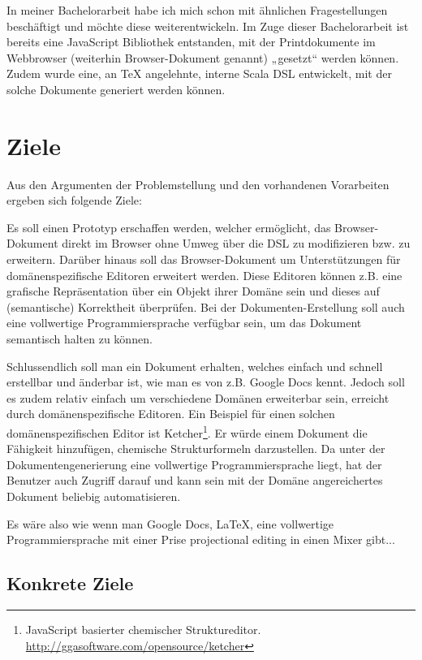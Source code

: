 In meiner Bachelorarbeit habe ich mich schon mit ähnlichen Fragestellungen
beschäftigt und möchte diese weiterentwickeln.
Im Zuge dieser Bachelorarbeit ist bereits eine JavaScript Bibliothek
entstanden, mit der Printdokumente im Webbrowser
(weiterhin Browser-Dokument genannt) „gesetzt“ werden können.
Zudem wurde eine, an TeX angelehnte, interne Scala DSL entwickelt,
mit der solche Dokumente generiert werden können.


\section{Ziele}

Aus den Argumenten der Problemstellung und den vorhandenen Vorarbeiten
ergeben sich folgende Ziele:

Es soll einen Prototyp erschaffen werden, welcher ermöglicht,
das Browser-Doku\-ment direkt im Browser ohne Umweg über die DSL
zu modifizieren bzw. zu erweitern.
Darüber hinaus soll das Browser-Dokument um Unterstützungen für
domänenspezifische Editoren erweitert werden.
Diese Editoren können z.B. eine grafische Repräsentation über ein Objekt
ihrer Domäne sein und dieses auf (semantische) Korrektheit überprüfen.
Bei der Dokumenten-Erstellung soll auch eine vollwertige Programmiersprache
verfügbar sein, um das Dokument semantisch halten zu können.

Schlussendlich soll man ein Dokument erhalten, welches einfach und schnell erstellbar und änderbar ist, wie man es von z.B. Google Docs kennt.
Jedoch soll es zudem relativ einfach um verschiedene Domänen erweiterbar sein,
erreicht durch domänenspezifische Editoren.
Ein Beispiel für einen solchen domänenspezifischen Editor ist
Ketcher\footnote{JavaScript basierter chemischer Struktureditor. \url{http://ggasoftware.com/opensource/ketcher}}. Er würde einem Dokument die Fähigkeit hinzufügen,
chemische Strukturformeln darzustellen.
Da unter der Dokumentengenerierung eine vollwertige
Programmiersprache liegt, hat der Benutzer auch Zugriff darauf und kann sein
mit der Domäne angereichertes Dokument beliebig automatisieren.

Es wäre also wie wenn man Google Docs, LaTeX, eine vollwertige Programmiersprache
mit einer Prise projectional editing in einen Mixer gibt...

\subsection{Konkrete Ziele}

